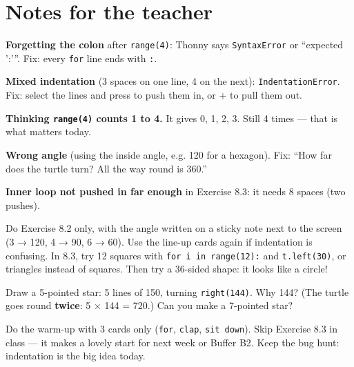 \section{Notes for the teacher}
\begin{commonmistakes}
  \item \textbf{Forgetting the colon} after \texttt{range(4)}: Thonny says \texttt{SyntaxError} or \enquote{expected ':'}. Fix: every \texttt{for} line ends with \texttt{:}.
  \item \textbf{Mixed indentation} (3 spaces on one line, 4 on the next): \texttt{IndentationError}. Fix: select the lines and press  to push them in, or + to pull them out.
  \item \textbf{Thinking \texttt{range(4)} counts 1 to 4.} It gives 0, 1, 2, 3. Still 4 times --- that is what matters today.
  \item \textbf{Wrong angle} (using the inside angle, e.g. 120 for a hexagon). Fix: \enquote{How far does the turtle turn? All the way round is 360.}
  \item \textbf{Inner loop not pushed in far enough} in Exercise 8.3: it needs 8 spaces (two pushes).
\end{commonmistakes}
\begin{differentiation}
\supportpath Do Exercise 8.2 only, with the angle written on a sticky note next to the screen (3 → 120, 4 → 90, 6 → 60). Use the line-up cards again if indentation is confusing.
\extensionpath In 8.3, try 12 squares with \texttt{for i in range(12):} and \texttt{t.left(30)}, or triangles instead of squares. Then try a 36-sided shape: it looks like a circle!
\end{differentiation}
\begin{stretchchallenge}
Draw a 5-pointed star: 5 lines of 150, turning \texttt{right(144)}. Why 144? (The turtle goes round \textbf{twice}: 5 × 144 = 720.) Can you make a 7-pointed star?
\end{stretchchallenge}
\begin{teachernote}
Do the warm-up with 3 cards only (\texttt{for}, \texttt{clap}, \texttt{sit down}). Skip Exercise 8.3 in class --- it makes a lovely start for next week or Buffer B2. Keep the bug hunt: indentation is the big idea today.
\end{teachernote}
